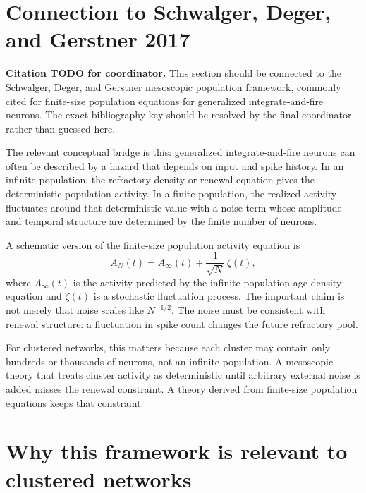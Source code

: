 \section{Connection to Schwalger, Deger, and Gerstner 2017}
\label{sec:connection-schwalger-deger-gerstner}

\textbf{Citation TODO for coordinator.} This section should be connected to the Schwalger, Deger, and Gerstner mesoscopic population framework, commonly cited for finite-size population equations for generalized integrate-and-fire neurons. The exact bibliography key should be resolved by the final coordinator rather than guessed here.

The relevant conceptual bridge is this: generalized integrate-and-fire neurons can often be described by a hazard that depends on input and spike history. In an infinite population, the refractory-density or renewal equation gives the deterministic population activity. In a finite population, the realized activity fluctuates around that deterministic value with a noise term whose amplitude and temporal structure are determined by the finite number of neurons.

A schematic version of the finite-size population activity equation is
%
\begin{equation}
  A_N(t)
  =
  A_\infty(t)
  +
  \frac{1}{\sqrt{N}}\,
  \zeta(t),
  \label{eq:sdg-schematic-finite-size}
\end{equation}
%
where $A_\infty(t)$ is the activity predicted by the infinite-population age-density equation and $\zeta(t)$ is a stochastic fluctuation process. The important claim is not merely that noise scales like $N^{-1/2}$. The noise must be consistent with renewal structure: a fluctuation in spike count changes the future refractory pool.

For clustered networks, this matters because each cluster may contain only hundreds or thousands of neurons, not an infinite population. A mesoscopic theory that treats cluster activity as deterministic until arbitrary external noise is added misses the renewal constraint. A theory derived from finite-size population equations keeps that constraint.

\section{Why this framework is relevant to clustered networks}
\label{sec:why-age-framework-relevant-clustered}

